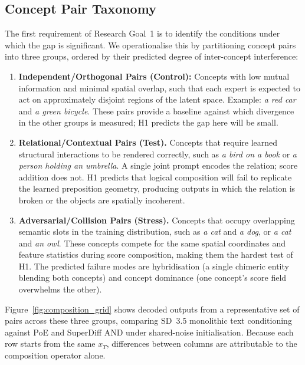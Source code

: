\subsection{Concept Pair Taxonomy}
\label{subsec:taxonomy}

The first requirement of Research Goal~1 is to identify the conditions under which the gap is significant.
We operationalise this by partitioning concept pairs into three groups, ordered by their predicted degree of inter-concept interference:

\begin{enumerate}

    \item \textbf{Independent/Orthogonal Pairs (Control):}
    Concepts with low mutual information and minimal spatial overlap, such that each expert is expected to act on approximately disjoint regions of the latent space.
    Example: \emph{a red car} and \emph{a green bicycle}.
    These pairs provide a baseline against which divergence in the other groups is measured; H1 predicts the gap here will be small.

    \item \textbf{Relational/Contextual Pairs (Test).}
    Concepts that require learned structural interactions to be rendered correctly, such as \emph{a bird on a book} or \emph{a person holding an umbrella}.
    A single joint prompt encodes the relation; score addition does not.
    H1 predicts that logical composition will fail to replicate the learned preposition geometry, producing outputs in which the relation is broken or the objects are spatially incoherent.

    \item \textbf{Adversarial/Collision Pairs (Stress).}
    Concepts that occupy overlapping semantic slots in the training distribution, such as \emph{a cat} and \emph{a dog}, or \emph{a cat} and \emph{an owl}.
    These concepts compete for the same spatial coordinates and feature statistics during score composition, making them the hardest test of H1.
    The predicted failure modes are hybridisation (a single chimeric entity blending both concepts) and concept dominance (one concept's score field overwhelms the other).

\end{enumerate}

Figure~\ref{fig:composition_grid} shows decoded outputs from a representative set of pairs across these three groups, comparing SD~3.5 monolithic text conditioning against PoE and SuperDiff AND under shared-noise initialisation.
Because each row starts from the same $x_T$, differences between columns are attributable to the composition operator alone.

